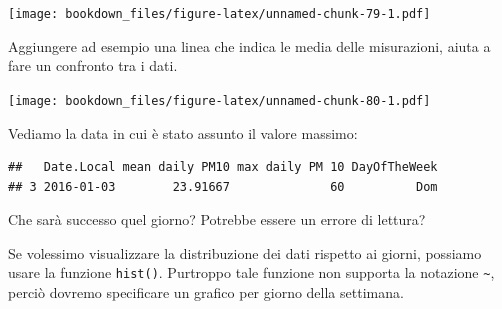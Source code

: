 \documentclass[]{book}
\newenvironment{Shaded}{\begin{snugshade}}{\end{snugshade}}
\newcommand{\DataTypeTok}[1]{\textcolor[rgb]{0.13,0.29,0.53}{#1}}
\newcommand{\DecValTok}[1]{\textcolor[rgb]{0.00,0.00,0.81}{#1}}
\newcommand{\KeywordTok}[1]{\textcolor[rgb]{0.13,0.29,0.53}{\textbf{#1}}}
\newcommand{\NormalTok}[1]{#1}
\newcommand{\OperatorTok}[1]{\textcolor[rgb]{0.81,0.36,0.00}{\textbf{#1}}}
\newcommand{\StringTok}[1]{\textcolor[rgb]{0.31,0.60,0.02}{#1}}
\begin{document}
\texttt{[image: bookdown\_files/figure-latex/unnamed-chunk-79-1.pdf]}

Aggiungere ad esempio una linea che indica le media delle misurazioni, aiuta a fare un confronto tra i dati.

\begin{Shaded}
\end{Shaded}

\texttt{[image: bookdown\_files/figure-latex/unnamed-chunk-80-1.pdf]}

Vediamo la data in cui è stato assunto il valore massimo:

\begin{Shaded}
\end{Shaded}

\begin{verbatim}
##   Date.Local mean daily PM10 max daily PM 10 DayOfTheWeek
## 3 2016-01-03        23.91667              60          Dom
\end{verbatim}

Che sarà successo quel giorno? Potrebbe essere un errore di lettura?

Se volessimo visualizzare la distribuzione dei dati rispetto ai giorni, possiamo usare la funzione \texttt{hist()}. Purtroppo tale funzione non supporta la notazione \texttt{\textasciitilde{}}, perciò dovremo specificare un grafico per giorno della settimana.
\end{document}
